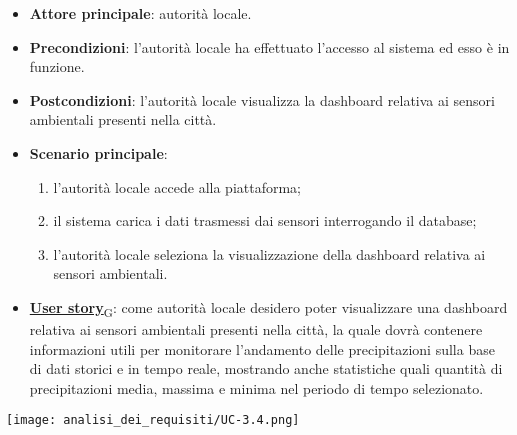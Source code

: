 \begin{itemize}
	\item \textbf{Attore principale}: autorità locale.
	\item \textbf{Precondizioni}: l'autorità locale ha effettuato l'accesso al sistema ed esso è in funzione.
	\item \textbf{Postcondizioni}: l'autorità locale visualizza la dashboard relativa
	      ai sensori ambientali presenti nella città.
	\item \textbf{Scenario principale}:
	      \begin{enumerate}
		      \item l'autorità locale accede alla piattaforma;
		      \item il sistema carica i dati trasmessi dai sensori interrogando il database;
		      \item l'autorità locale seleziona la visualizzazione della dashboard relativa ai sensori ambientali.
	      \end{enumerate}
	\item \href{https://7last.github.io/docs/pb/documentazione-interna/glossario\#user-story}{\textbf{User story}\textsubscript{G}}:
	      come autorità locale desidero poter visualizzare una dashboard relativa ai sensori ambientali presenti nella città, la quale
	      dovrà contenere informazioni utili per monitorare l'andamento delle precipitazioni sulla base di dati storici e in tempo reale, mostrando
	      anche statistiche quali quantità di precipitazioni media, massima e minima nel periodo di tempo selezionato.
\end{itemize}
\begin{center}
	\texttt{[image: analisi\_dei\_requisiti/UC-3.4.png]}
\end{center}



